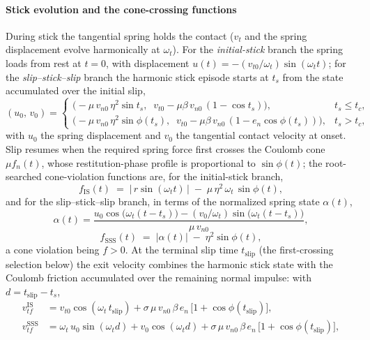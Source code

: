 \paragraph{Stick evolution and the cone-crossing functions} During
stick the tangential spring holds the contact ($v_t$ and the spring
displacement evolve harmonically at $\omega_t$). For the
\emph{initial-stick} branch the spring loads from rest at $t = 0$,
with displacement $u(t) = -(v_{t0}/\omega_t)\sin(\omega_t t)$; for the
\emph{slip--stick--slip} branch the harmonic stick episode starts at
$t_s$ from the state accumulated over the initial slip,
\begin{equation}
(u_0,\, v_0) =
\begin{cases}
\bigl(-\mu\,v_{n0}\,\eta^{2}\sin t_s,\;\;
v_{t0} - \mu\beta\,v_{n0}\,(1 - \cos t_s)\bigr), & t_s \le t_c,\\[4pt]
\bigl(-\mu\,v_{n0}\,\eta^{2}\sin\phi(t_s),\;\;
v_{t0} - \mu\beta\,v_{n0}\,(1 - e_n\cos\phi(t_s))\bigr), & t_s > t_c,
\end{cases}
\label{eq:stronge-stickstate}
\end{equation}
with $u_0$ the spring displacement and $v_0$ the tangential contact
velocity at onset. Slip resumes when the required spring force first
crosses the Coulomb cone $\mu f_n(t)$, whose restitution-phase profile
is proportional to $\sin\phi(t)$; the root-searched cone-violation
functions are, for the initial-stick branch,
\begin{equation}
f_{\mathrm{IS}}(t) \;=\; \bigl|\,r\sin(\omega_t t)\,\bigr|
\;-\; \mu\,\eta^{2}\,\omega_t\,\sin\phi(t),
\label{eq:stronge-cone-is}
\end{equation}
and for the slip--stick--slip branch, in terms of the normalized
spring state $\alpha(t)$,
\begin{equation}
\alpha(t) = \frac{u_0\cos\bigl(\omega_t(t - t_s)\bigr)
- (v_0/\omega_t)\sin\bigl(\omega_t(t - t_s)\bigr)}{\mu\,v_{n0}},
\label{eq:stronge-alpha}
\end{equation}
\begin{equation}
f_{\mathrm{SSS}}(t) \;=\; |\alpha(t)| \;-\; \eta^{2}\sin\phi(t),
\label{eq:stronge-cone-sss}
\end{equation}
a cone violation being $f > 0$. At the terminal slip time
$t_{\mathrm{slip}}$ (the first-crossing selection below) the exit
velocity combines the harmonic stick state with the Coulomb friction
accumulated over the remaining normal impulse: with
$d = t_{\mathrm{slip}} - t_s$,
\begin{align}
v_{tf}^{\mathrm{IS}} &= v_{t0}\cos(\omega_t\,t_{\mathrm{slip}})
+ \sigma\,\mu\,v_{n0}\,\beta\,e_n\,
\bigl[1 + \cos\phi(t_{\mathrm{slip}})\bigr],
\label{eq:stronge-vtf}\\
v_{tf}^{\mathrm{SSS}} &= \omega_t\,u_0\sin(\omega_t d)
+ v_0\cos(\omega_t d)
+ \sigma\,\mu\,v_{n0}\,\beta\,e_n\,
\bigl[1 + \cos\phi(t_{\mathrm{slip}})\bigr],
\label{eq:stronge-vtf-sss}
\end{align}
